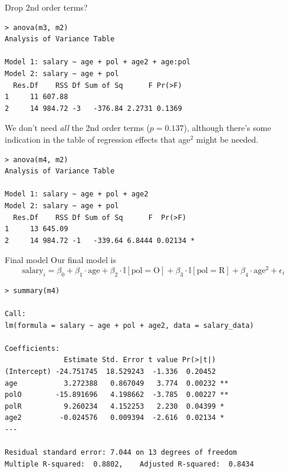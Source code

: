 \documentclass{beamer}
\begin{document}
\begin{frame}[fragile]{Drop 2nd order terms?}
\begin{footnotesize}
\begin{verbatim}
> anova(m3, m2)
Analysis of Variance Table

Model 1: salary ~ age + pol + age2 + age:pol
Model 2: salary ~ age + pol
  Res.Df    RSS Df Sum of Sq      F Pr(>F)
1     11 607.88                           
2     14 984.72 -3   -376.84 2.2731 0.1369    
\end{verbatim}
\end{footnotesize}
\pause We don't need \textit{all} the 2nd order terms ($p=0.137$), although there’s some indication in the table of regression effects that age$^2$ might be needed.
\pause\begin{footnotesize}
\begin{verbatim}
> anova(m4, m2)
Analysis of Variance Table

Model 1: salary ~ age + pol + age2
Model 2: salary ~ age + pol
  Res.Df    RSS Df Sum of Sq      F  Pr(>F)  
1     13 645.09                              
2     14 984.72 -1   -339.64 6.8444 0.02134 *
\end{verbatim}
\end{footnotesize}
\end{frame}

\begin{frame}[fragile]{Final model}
Our final model is 
$$
\text{salary}_i = \beta_0+\beta_1\cdot\text{age}+\beta_{2}\cdot\mathbb{I}[\text{pol}=\text{O}]+\beta_{3}\cdot\mathbb{I}[\text{pol}=\text{R}]+\beta_{4}\cdot\text{age}^2+\epsilon_i
$$
\begin{footnotesize}
\begin{verbatim}
> summary(m4)

Call:
lm(formula = salary ~ age + pol + age2, data = salary_data)

Coefficients:
              Estimate Std. Error t value Pr(>|t|)   
(Intercept) -24.751745  18.529243  -1.336  0.20452   
age           3.272388   0.867049   3.774  0.00232 **
polO        -15.891696   4.198662  -3.785  0.00227 **
polR          9.260234   4.152253   2.230  0.04399 * 
age2         -0.024576   0.009394  -2.616  0.02134 * 
---

Residual standard error: 7.044 on 13 degrees of freedom
Multiple R-squared:  0.8802,	Adjusted R-squared:  0.8434 
\end{verbatim}
\end{footnotesize}
\end{frame}
\end{document}
